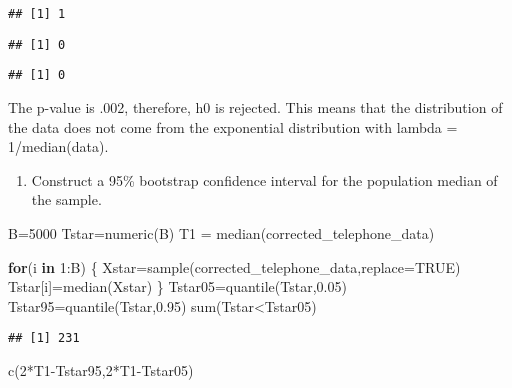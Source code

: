 \documentclass[
]{article}
\newenvironment{Shaded}{\begin{snugshade}}{\end{snugshade}}
\newcommand{\AttributeTok}[1]{\textcolor[rgb]{0.77,0.63,0.00}{#1}}
\newcommand{\ConstantTok}[1]{\textcolor[rgb]{0.00,0.00,0.00}{#1}}
\newcommand{\ControlFlowTok}[1]{\textcolor[rgb]{0.13,0.29,0.53}{\textbf{#1}}}
\newcommand{\DecValTok}[1]{\textcolor[rgb]{0.00,0.00,0.81}{#1}}
\newcommand{\FloatTok}[1]{\textcolor[rgb]{0.00,0.00,0.81}{#1}}
\newcommand{\FunctionTok}[1]{\textcolor[rgb]{0.00,0.00,0.00}{#1}}
\newcommand{\NormalTok}[1]{#1}
\newcommand{\OtherTok}[1]{\textcolor[rgb]{0.56,0.35,0.01}{#1}}
\newcommand{\SpecialCharTok}[1]{\textcolor[rgb]{0.00,0.00,0.00}{#1}}
\providecommand{\tightlist}{%
  \setlength{\itemsep}{0pt}\setlength{\parskip}{0pt}}
\begin{document}
\begin{verbatim}
## [1] 1
\end{verbatim}

\begin{verbatim}
## [1] 0
\end{verbatim}

\begin{verbatim}
## [1] 0
\end{verbatim}

The p-value is .002, therefore, h0 is rejected. This means that the
distribution of the data does not come from the exponential distribution
with lambda = 1/median(data).

\begin{enumerate}
\def\labelenumi{\alph{enumi})}
\setcounter{enumi}{2}
\tightlist
\item
  Construct a 95\% bootstrap confidence interval for the population
  median of the sample.
\end{enumerate}

\begin{Shaded}
\begin{Highlighting}[]
\NormalTok{B}\OtherTok{=}\DecValTok{5000}
\NormalTok{Tstar}\OtherTok{=}\FunctionTok{numeric}\NormalTok{(B)}
\NormalTok{T1 }\OtherTok{=} \FunctionTok{median}\NormalTok{(corrected\_telephone\_data)}

\ControlFlowTok{for}\NormalTok{(i }\ControlFlowTok{in} \DecValTok{1}\SpecialCharTok{:}\NormalTok{B) \{}
\NormalTok{  Xstar}\OtherTok{=}\FunctionTok{sample}\NormalTok{(corrected\_telephone\_data,}\AttributeTok{replace=}\ConstantTok{TRUE}\NormalTok{)}
\NormalTok{  Tstar[i]}\OtherTok{=}\FunctionTok{median}\NormalTok{(Xstar) \}}
\NormalTok{  Tstar05}\OtherTok{=}\FunctionTok{quantile}\NormalTok{(Tstar,}\FloatTok{0.05}\NormalTok{)}
\NormalTok{  Tstar95}\OtherTok{=}\FunctionTok{quantile}\NormalTok{(Tstar,}\FloatTok{0.95}\NormalTok{)}
  \FunctionTok{sum}\NormalTok{(Tstar}\SpecialCharTok{\textless{}}\NormalTok{Tstar05)}
\end{Highlighting}
\end{Shaded}

\begin{verbatim}
## [1] 231
\end{verbatim}

\begin{Shaded}
\begin{Highlighting}[]
\FunctionTok{c}\NormalTok{(}\DecValTok{2}\SpecialCharTok{*}\NormalTok{T1}\SpecialCharTok{{-}}\NormalTok{Tstar95,}\DecValTok{2}\SpecialCharTok{*}\NormalTok{T1}\SpecialCharTok{{-}}\NormalTok{Tstar05)}
\end{Highlighting}
\end{Shaded}
\end{document}
